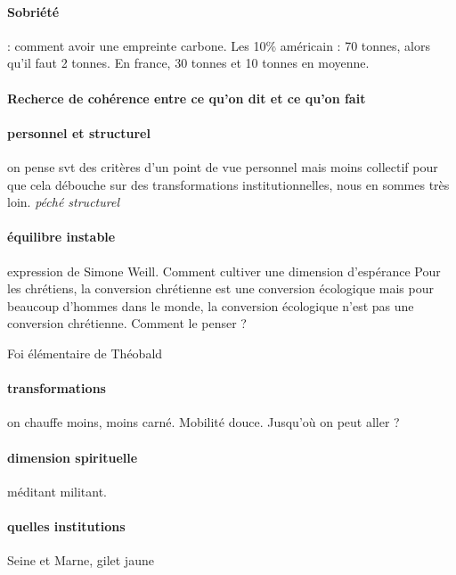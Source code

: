 \paragraph{Sobriété}  : comment avoir une empreinte carbone. Les 10\% américain : 70 tonnes, alors qu'il faut 2 tonnes. En france, 30 tonnes et 10 tonnes en moyenne.

\paragraph{Recherce de cohérence entre ce qu'on dit et ce qu'on fait}

\paragraph{personnel et structurel} on pense svt des critères d'un point de vue personnel mais moins collectif pour que cela débouche sur des transformations institutionnelles, nous en sommes très loin. \textit{péché structurel}

\paragraph{équilibre instable} expression de Simone Weill. Comment cultiver une dimension d'espérance 
Pour les chrétiens, la conversion chrétienne est une conversion écologique mais pour beaucoup d'hommes dans le monde, la conversion écologique n'est pas une conversion chrétienne. Comment le penser ? 

Foi élémentaire de Théobald

\paragraph{transformations} on chauffe moins, moins carné. Mobilité douce. Jusqu'où on peut aller ? 

\paragraph{dimension spirituelle} méditant militant.

\paragraph{quelles institutions} Seine et Marne, gilet jaune

